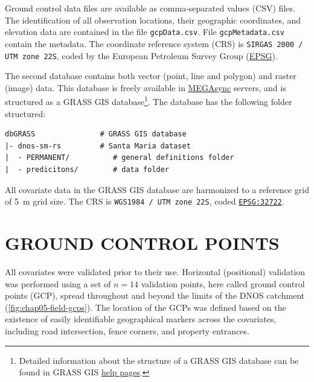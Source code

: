 Ground control data files are available as comma-separated values (CSV) files. The identification of all 
observation locations, their geographic coordinates, and elevation data are contained in the file 
\texttt{gcpData.csv}. File \texttt{gcpMetadata.csv} contain the metadata. The coordinate reference system 
(CRS) is \texttt{SIRGAS 2000 / UTM zone 22S}, coded \sirgas{} by the European Petroleum Survey Group 
(\href{http://www.epsg.org/}{EPSG}).

\def\megasync{\href{https://mega.nz/\#F!aY5CRQqY}{MEGAsync}}

\def\footgrass{\footnote{Detailed information about the structure of a GRASS GIS database can be found in 
GRASS GIS \href{https://grass.osgeo.org/grass64/manuals/helptext.html}{help pages}.}}

The second database contains both vector (point, line and polygon) and raster (image) data. This database is 
freely available in \megasync{} servers, and is structured as a GRASS GIS database\footgrass{}. The database 
has the following folder structured:

\begin{verbatim}
dbGRASS               # GRASS GIS database
|- dnos-sm-rs         # Santa Maria dataset
|  - PERMANENT/          # general definitions folder
|  - predicitons/        # data folder
\end{verbatim}

\def\wgs{\href{http://spatialreference.org/ref/epsg/32722/}{\texttt{EPSG:32722}}}

All covariate data in the GRASS GIS database are harmonized to a reference grid of \SI{5}{\m} grid size. The 
CRS is \texttt{WGS1984 / UTM zone 22S}, coded \wgs{}.

\section{GROUND CONTROL POINTS}
\label{sec:chap05-gcp}

All covariates were validated prior to their use. Horizontal (positional) validation was performed using a set
of $n = 14$ validation points, here called ground control points (GCP), spread throughout and beyond the 
limits of the DNOS catchment (\autoref{fig:chap05-field-gcps}). The location of the GCPs was defined based on 
the existence of easily identifiable geographical markers across the covariates, including road intersection, 
fence corners, and property entrances.

